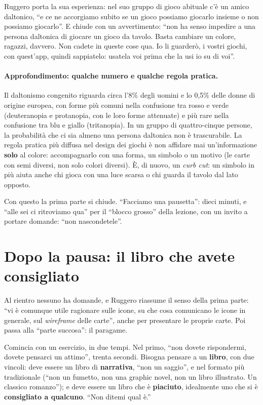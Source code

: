 Ruggero porta la sua esperienza: nel suo gruppo di gioco abituale c'è un amico
daltonico, ``e ce ne accorgiamo subito se un gioco possiamo giocarlo insieme o non
possiamo giocarlo''. E chiude con un avvertimento: ``non ha senso impedire a una
persona daltonica di giocare un gioco da tavolo. Basta cambiare un colore, ragazzi,
davvero. Non cadete in queste cose qua. Io li guarderò, i vostri giochi, con
quest'app, quindi sappiatelo: usatela voi prima che la usi io su di voi''.

\paragraph{Approfondimento: qualche numero e qualche regola pratica.} Il daltonismo
congenito riguarda circa l'8\% degli uomini e lo 0,5\% delle donne di origine europea,
con forme più comuni nella confusione tra rosso e verde (deuteranopia e protanopia,
con le loro forme attenuate) e più rare nella confusione tra blu e giallo (tritanopia).
In un gruppo di quattro-cinque persone, la probabilità che ci sia almeno una persona
daltonica non è trascurabile. La regola pratica più diffusa nel design dei giochi è non
affidare mai un'informazione \textbf{solo} al colore: accompagnarlo con una forma, un
simbolo o un motivo (le carte con semi diversi, non solo colori diversi). È, di nuovo,
un \emph{curb cut}: un simbolo in più aiuta anche chi gioca con una luce scarsa o chi
guarda il tavolo dal lato opposto.

\medskip
Con questo la prima parte si chiude. ``Facciamo una pausetta'': dieci minuti, e
``alle sei ci ritroviamo qua'' per il ``blocco grosso'' della lezione, con un invito a
portare domande: ``non nascondetele''.

\section{Dopo la pausa: il libro che avete consigliato}
\label{a10:sec:libro}

Al rientro nessuno ha domande, e Ruggero riassume il senso della prima parte: ``vi è
comunque utile ragionare sulle icone, su che cosa comunicano le icone in generale, sul
\emph{wireframe} delle carte'', anche per presentare le proprie carte. Poi passa alla
``parte succosa'': il paragame.

Comincia con un esercizio, in due tempi. Nel primo, ``non dovete rispondermi, dovete
pensarci un attimo'', trenta secondi. Bisogna pensare a un \textbf{libro}, con due
vincoli: deve essere un libro di \textbf{narrativa}, ``non un saggio'', e nel formato
più tradizionale (``non un fumetto, non una graphic novel, non un libro illustrato. Un
classico romanzo''); e deve essere un libro che è \textbf{piaciuto}, idealmente uno che
si è \textbf{consigliato a qualcuno}. ``Non ditemi qual è.''


